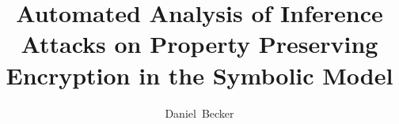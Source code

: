 \documentclass[journal]{IEEEtran}
\begin{document}
%
\title{Automated Analysis of Inference Attacks on Property Preserving Encryption in the Symbolic Model}
%
%

\author{Daniel~Becker}
% 
%
\end{document}
